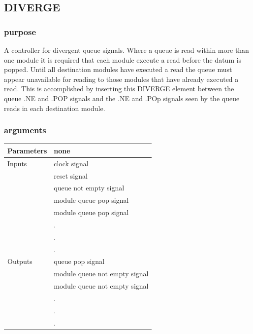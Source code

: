 \documentclass[10pt,a4paper,twoside,fleqn]{book}
\begin{document}
            \subsection{DIVERGE}

                \subsubsection{purpose}

                    A controller for divergent queue signals. Where a queue is read
                    within more than one module it is required that each module
                    execute a read before the datum is popped. Until all destination
                    modules have executed a read the queue must appear unavailable
                    for reading to those modules that have already executed a read.
                    This is accomplished by inserting this DIVERGE element between
                    the queue .NE and .POP signals and the .NE and .POp signals
                    seen by the queue reads in each destination module.

                \subsubsection{arguments}

                    \begin{tabular}{| l | l |}
                    \hline
                    Parameters  & none \\
                    \hline
                    Inputs      & clock signal \\
                                & reset signal \\
                                & queue not empty signal \\
                                & module queue pop signal \\
                                & module queue pop signal \\
                                & . \\
                                & . \\
                                & . \\
                    \hline
                    Outputs     & queue pop signal \\
                                & module queue not empty signal \\
                                & module queue not empty signal \\
                                & . \\
                                & . \\
                                & . \\
                    \hline
                    \end{tabular}
\end{document}
